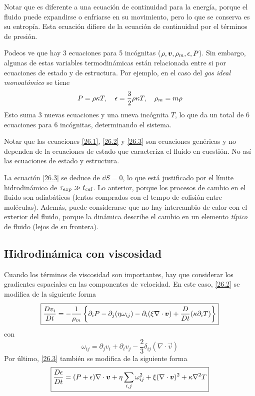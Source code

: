 Notar que es diferente a una ecuación de continuidad para la energía, porque el fluido puede expandirse o enfriarse en su movimiento, pero lo que se conserva es su entropía. Esta ecuación difiere de la ecuación de continuidad por el términos de presión.

Podeos ve que hay 3 ecuaciones para 5 incógnitas ($\rho,\vb*{v},\rho_m,\epsilon,P$). Sin embargo, algunas de estas variables termodinámicas están relacionada entre si por ecuaciones de estado y de estructura. Por ejemplo, en el caso del \textit{gas ideal monoatómico} se tiene
\begin{equation}
  P=\rho\kappa T,\quad \epsilon=\frac{3}{2}\rho\kappa T,\quad \rho_m=m\rho 
\end{equation}
Esto suma 3 nuevas ecuaciones y una nueva incógnita $T$, lo que da un total de 6 ecuaciones para 6 incógnitas, determinando el sistema.

Notar que las ecuaciones \eqref{26.1}, \eqref{26.2} y \eqref{26.3} son ecuaciones genéricas y no dependen de la ecuaciones de estado que caracteriza el fluido en cuestión. No así las ecuaciones de estado y estructura.

La ecuación \eqref{26.3} se deduce de $\dd S=0$, lo que está justificado por el límite hidrodinámico de $\tau_{exp}\gg t_{cal}$. Lo anterior, porque los procesos de cambio en el fluido son adiabáticos (lentos comprados con el tempo de colisión entre moléculas). Además, puede considerarse que no hay intercambio de calor con el exterior del fluido, porque la dinámica describe el cambio en un elemento \textit{típico} de fluido (lejos de su frontera).

\subsection{Hidrodinámica con viscosidad}
Cuando los términos de viscosidad son importantes, hay que considerar los gradientes espaciales en las componentes de velocidad. En este caso, \eqref{26.2} se modifica de la siguiente forma
\begin{equation}\label{26.22}
  \boxed{\frac{D v_i}{Dt}=-\frac{1}{\rho_m}\left\{\partial_iP-\partial_j(\eta\omega_{ij})-\partial_i(\xi \nabla\cdot\vb*{v})+\frac{D}{Dt}(\kappa\partial_i T)\right\}}
\end{equation}
con 
\begin{equation}\label{26.33}
  \omega_{ij}=\partial_jv_i+\partial_iv_j-\frac{2}{3}\delta_{ij}(\nabla\cdot\vec{v})
\end{equation}
Por último, \eqref{26.3} también se modifica de la siguiente forma
\begin{equation}
\boxed{  \frac{D\epsilon }{Dt}=(P+\epsilon)\nabla\cdot\vb*{v}+\eta\sum_{i,j}\omega_{ij}^2+\xi(\nabla\cdot\vb*{v})^2+\kappa\nabla^2T}
\end{equation}

